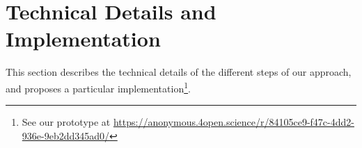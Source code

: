 








\section{Technical Details and Implementation}
\label{transformation}

This section describes the technical details of the different steps of our approach, and proposes a particular implementation\footnote{See our prototype at \url{https://anonymous.4open.science/r/84105ce9-f47c-4dd2-936e-9eb2dd345ad0/}}. 

